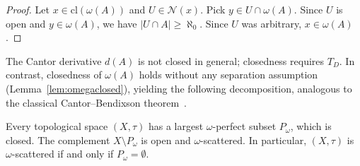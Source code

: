 \documentclass[submission,copyright,creativecommons]{eptcs}
\newcommand{\cl}{\mathrm{cl}}
\newcommand{\Nbd}{\mathcal{N}}
\begin{document}
\begin{proof}
Let $x \in \cl(\omega(A))$ and $U \in \Nbd(x)$.
Pick $y \in U \cap \omega(A)$.
Since $U$ is open and $y \in \omega(A)$, we have $|U \cap A| \geq \aleph_0$.
Since $U$ was arbitrary, $x \in \omega(A)$.
\end{proof}
The Cantor derivative $d(A)$ is not closed in general; closedness requires $T_D$.
In contrast, closedness of $\omega(A)$ holds without any separation assumption (Lemma~\ref{lem:omegaclosed}), yielding the following decomposition, analogous to the classical Cantor--Bendixson theorem~\cite{Kechris1995}.

\begin{theorem}
\label{thm:omegaCB}
Every topological space $(X,\tau)$ has a largest $\omega$-perfect subset $P_\omega$, which is closed.
The complement $X \setminus P_\omega$ is open and $\omega$-scattered.
In particular, $(X,\tau)$ is $\omega$-scattered if and only if $P_\omega = \emptyset$.
\end{theorem}
\end{document}
